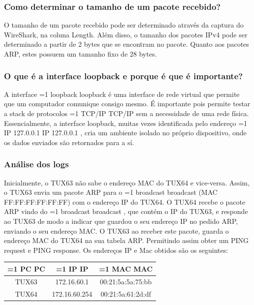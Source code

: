 \documentclass[11pt,a4paper]{article}
\newcommand{\hl}[2][1]{%
  \ifnum#1=1\relax
    \textcolor{text-hl1}{#2}%
  \else
    \textcolor{text-hl2}{#2}%
  \fi
}
\begin{document}
\begin{multicols}{2}
\subsubsection{Como determinar o tamanho de um pacote recebido?}

O tamanho de um pacote recebido pode ser determinado através da captura do WireShark, na coluna Length. Além disso, o tamanho dos pacotes IPv4 pode ser determinado a partir de 2 bytes que se encontram no pacote. Quanto aos pacotes ARP, estes possuem um tamanho fixo de 28 bytes.

\subsubsection{O que é a interface loopback e porque é que é importante?}

A interface \hl{loopback} é uma interface de rede virtual que permite que um computador comunique consigo mesmo. É importante pois permite testar a stack de protocolos \hl[2]{TCP/IP} sem a necessidade de uma rede física. Essencialmente, a interface loopback, muitas vezes identificada pelo endereço \hl[2]{IP 127.0.0.1}, cria um ambiente isolado no próprio dispositivo, onde os dados enviados são retornados para a sí.

\subsubsection{Análise dos logs}\label{sec:analise-logs}

Inicialmente, o TUX63 não sabe o endereço MAC do TUX64 e vice-versa. Assim, o TUX63 envia um pacote ARP para o \hl{broadcast} (MAC FF:FF:FF:FF:FF:FF) com o endereço IP do TUX64. O TUX64 recebe o pacote ARP vindo do \hl{broadcast}, que contém o IP do TUX63, e responde ao TUX63 de modo a indicar que guardou o seu endereço IP no pedido ARP, enviando o seu endereço MAC. O TUX63 ao receber este pacote, guarda o endereço MAC do TUX64 na sua tabela ARP. Permitindo assim obter um PING request e PING response.
Os endereços IP e Mac obtidos são os seguintes:

\begin{table}[H]
    \centering
    \begin{tabular}{|c|c|c|}
        \hline
    \hl{PC} & \hl{IP} & \hl{MAC} \\ \hline
    TUX63 & 172.16.60.1 & 00:21:5a:5a:75:bb  \\
    TUX64 & 172.16.60.254 & 00:21:5a:61:2d:df \\
    \end{tabular}
\end{table}


\end{multicols}
\end{document}
